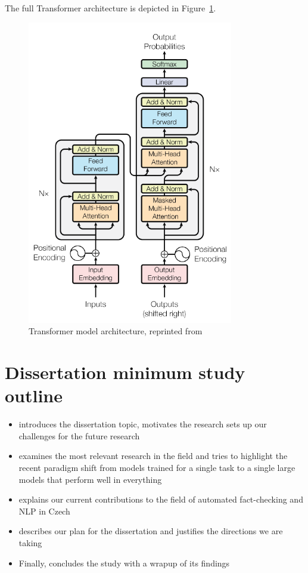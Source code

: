 The full Transformer architecture is depicted in Figure~\ref{fig:transformer}.

\begin{figure}
    \includegraphics[width=9cm]{fig/transformer.pdf}
    \caption{Transformer model architecture, reprinted from~\cite{vaswani}}
    \label{fig:transformer}
    \end{figure}

\section{Dissertation minimum study outline}
 
\begin{itemize}
\item {} introduces the dissertation topic, motivates the research sets up our challenges for the future research 

\item {} examines the most relevant research in the field and tries to highlight the recent paradigm shift from models trained for a single task to a single large models that perform well in everything

\item {} explains our current contributions to the field of automated fact-checking and NLP in Czech

\item {} describes our plan for the dissertation and justifies the directions we are taking

\item Finally, {} concludes the study with a wrapup of its findings

\end{itemize}

